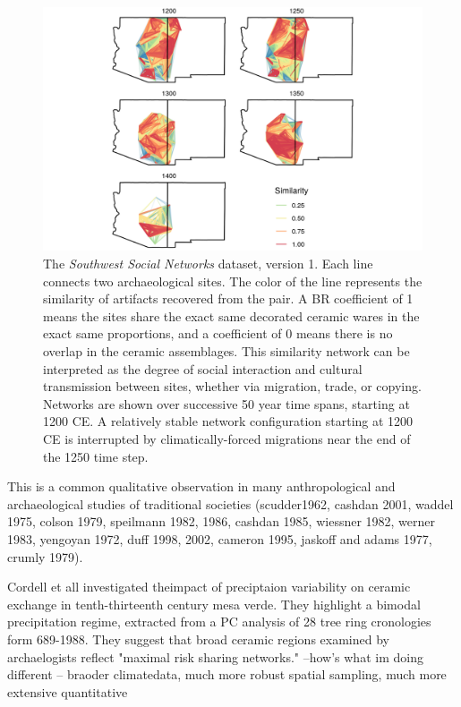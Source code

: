 \documentclass[fleqn,10pt]{wlscirep}
\begin{document}
\begin{figure}[ht]
\centering
\includegraphics[width=\linewidth]{figures/similarity_network.png}
\caption{The \emph{Southwest Social Networks} dataset, version 1. Each line connects two archaeological sites. The color of the line represents the similarity of artifacts recovered from the pair. A BR coefficient of 1 means the sites share the exact same decorated ceramic wares in the exact same proportions, and a coefficient of 0 means there is no overlap in the ceramic assemblages. This similarity network can be interpreted as the degree of social interaction and cultural transmission between sites, whether via migration, trade, or copying. Networks are shown over successive 50 year time spans, starting at 1200 CE. A relatively stable network configuration starting at 1200 CE is interrupted by climatically-forced migrations near the end of the 1250 time step.}
\label{fig:network-plot}
\end{figure}



This is a common qualitative observation in many anthropological and archaeological studies of traditional societies (scudder1962, cashdan 2001, waddel 1975, colson 1979, speilmann 1982, 1986, cashdan 1985, wiessner 1982, werner 1983, yengoyan 1972, duff 1998, 2002, cameron 1995, jaskoff and adams 1977, crumly 1979).



Cordell et all investigated theimpact of preciptaion variability on ceramic exchange in tenth-thirteenth century mesa verde. They highlight a bimodal precipitation regime, extracted from a PC analysis of 28 tree ring cronologies form 689-1988. They suggest that broad ceramic regions examined by archaelogists reflect "maximal risk sharing networks."
--how's what im doing different -- braoder climatedata, much more robust spatial sampling, much more extensive quantitative
\end{document}
